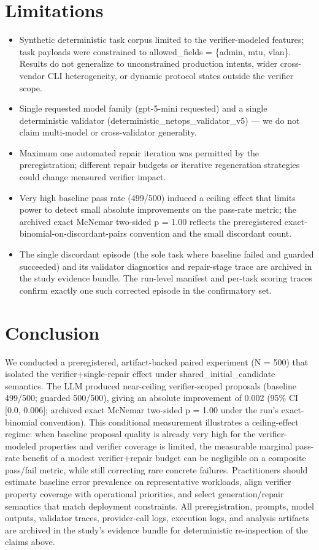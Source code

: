 \documentclass[conference]{IEEEtran}
\begin{document}
\section{Limitations}
\begin{itemize}
\item Synthetic deterministic task corpus limited to the verifier-modeled features; task payloads were constrained to allowed\_fields = \{admin, mtu, vlan\}. Results do not generalize to unconstrained production intents, wider cross-vendor CLI heterogeneity, or dynamic protocol states outside the verifier scope.
\item Single requested model family (gpt-5-mini requested) and a single deterministic validator (deterministic\_netops\_validator\_v5) --- we do not claim multi-model or cross-validator generality.
\item Maximum one automated repair iteration was permitted by the preregistration; different repair budgets or iterative regeneration strategies could change measured verifier impact.
\item Very high baseline pass rate (499/500) induced a ceiling effect that limits power to detect small absolute improvements on the pass-rate metric; the archived exact McNemar two-sided p = 1.00 reflects the preregistered exact-binomial-on-discordant-pairs convention and the small discordant count.
\item The single discordant episode (the sole task where baseline failed and guarded succeeded) and its validator diagnostics and repair-stage trace are archived in the study evidence bundle. The run-level manifest and per-task scoring traces confirm exactly one such corrected episode in the confirmatory set.
\end{itemize}

\section{Conclusion}
We conducted a preregistered, artifact-backed paired experiment (N = 500) that isolated the verifier+single-repair effect under shared\_initial\_candidate semantics. The LLM produced near-ceiling verifier-scoped proposals (baseline 499/500; guarded 500/500), giving an absolute improvement of 0.002 (95\% CI [0.0, 0.006]; archived exact McNemar two-sided p = 1.00 under the run's exact-binomial convention). This conditional measurement illustrates a ceiling-effect regime: when baseline proposal quality is already very high for the verifier-modeled properties and verifier coverage is limited, the measurable marginal pass-rate benefit of a modest verifier+repair budget can be negligible on a composite pass/fail metric, while still correcting rare concrete failures. Practitioners should estimate baseline error prevalence on representative workloads, align verifier property coverage with operational priorities, and select generation/repair semantics that match deployment constraints. All preregistration, prompts, model outputs, validator traces, provider-call logs, execution logs, and analysis artifacts are archived in the study's evidence bundle for deterministic re-inspection of the claims above.
\end{document}
